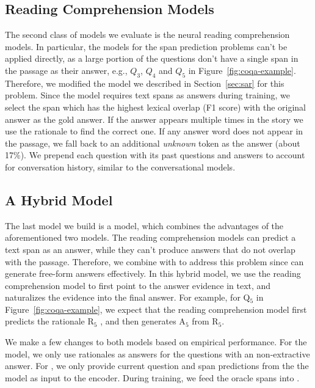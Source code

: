 \subsection{Reading Comprehension Models}
The second class of models we evaluate is the neural reading comprehension models. In particular, the models for the span prediction problems can't be applied directly, as a large portion of the  questions don't have a single span in the passage as their answer, e.g., $Q_3$, $Q_4$ and $Q_5$ in Figure~\ref{fig:coqa-example}. Therefore, we modified the  model we described in Section~\ref{sec:sar} for this problem. Since the model requires text spans as answers during training, we select the span which has the highest lexical overlap (F1 score) with the original answer as the gold answer. If the answer appears multiple times in the story we use the rationale to find the correct one. If any answer word does not appear in the passage, we fall back to an additional \textit{unknown} token as the answer (about 17\%). We prepend each question with its past questions and answers to account for conversation history, similar to the conversational models.

\subsection{A Hybrid Model}
The last model we build is a  model, which combines the advantages of the aforementioned two models. The reading comprehension models can predict a text span as an answer, while they can't produce answers that do not overlap with the passage. Therefore,  we combine  with  to address this problem since  can generate free-form answers effectively. In this hybrid model, we use the reading comprehension model to first point to the answer evidence in text, and  naturalizes the evidence into the final answer. For example, for Q$_5$ in Figure~\ref{fig:coqa-example}, we expect that the reading comprehension model first predicts the rationale R$_5$ , and then  generates A$_5$  from R$_5$.

We make a few changes to both models based on empirical performance. For the  model, we only use rationales as answers for the questions with an non-extractive answer. For , we only provide current question and span predictions from the the  model as input to the encoder. During training, we feed the oracle spans into .
